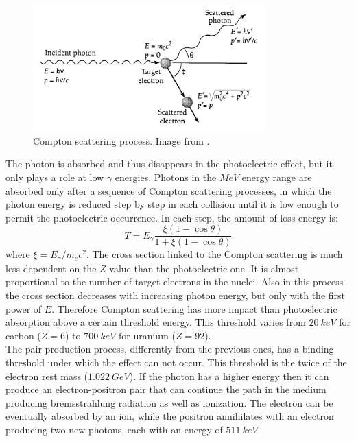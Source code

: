 \begin{figure}
	\centering
	\includegraphics[width=0.8\textwidth]{IMG/Cap2/scatt_kin.png}
	\caption{Compton scattering process. Image from \cite{Leo}.}
	\label{fig:scatt_kin}
\end{figure}

The photon is absorbed and thus disappears in the photoelectric effect, but it only plays a role at low $\gamma$ energies. Photons in the $MeV$ energy range are absorbed only after a sequence of Compton scattering processes, in which the photon energy is reduced step by step in each collision until it is low enough to permit the photoelectric occurrence. In each step, the amount of loss energy is:
\begin{equation}
    T = E_{\gamma}\frac{\xi(1 - \cos{\theta})}{1 + \xi(1 - \cos{\theta})}
\end{equation}
where $\xi = E_{\gamma}/m_ec^2$.
The cross section linked to the Compton scattering is much less dependent on the $Z$ value than the photoelectric one. It is almost proportional to the number of target electrons in the nuclei. Also in this process the cross section decreases with increasing photon energy, but only with the first power of $E$. Therefore Compton scattering has more impact than photoelectric absorption above a certain threshold energy. This  threshold varies from $20\ keV$ for carbon ($Z=6$) to $700\ keV$ for uranium ($Z=92$).\\

The pair production process, differently from the previous ones, has a binding threshold under which the effect can not occur. This threshold is the twice of the electron rest mass ($1.022\ GeV$). If the photon has a higher energy then it can produce an electron-positron pair that can continue the path in the medium producing bremsstrahlung radiation as well as ionization.
The electron can be eventually absorbed by an ion, while the positron annihilates with an electron producing two new photons, each with an energy of $511\ keV$.

